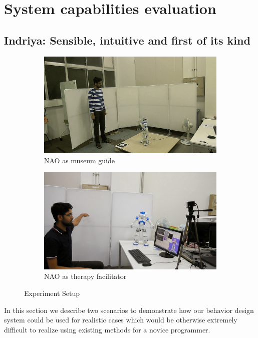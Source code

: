 
\chapter{System capabilities evaluation} %

\label{Chapter5} %


\section{Indriya: Sensible, intuitive and first of its kind}
\begin{figure}
\centering
\begin{subfigure}[t]{0.49\textwidth}
\includegraphics[width=\textwidth]{../thesis/assets/scenario_museum.png}
\caption[Experiment Setup 1]{NAO as museum guide}
\label{fig:scenario1_setup}
\end{subfigure}
\begin{subfigure}[t]{0.49\textwidth}
\includegraphics[width=\textwidth]{../thesis/assets/scenario_therapy.png}
\caption[Experiment Setup 2]{NAO as therapy facilitator}
\label{fig:scenario2_setup}
\end{subfigure}
\caption[Experiment Setup]{Experiment Setup}
\label{fig:scenarios_setup}
\end{figure}
	In this section we describe two scenarios to demonstrate how our behavior design system could be used for realistic cases which would be otherwise extremely difficult to realize using existing methods for a novice programmer.

